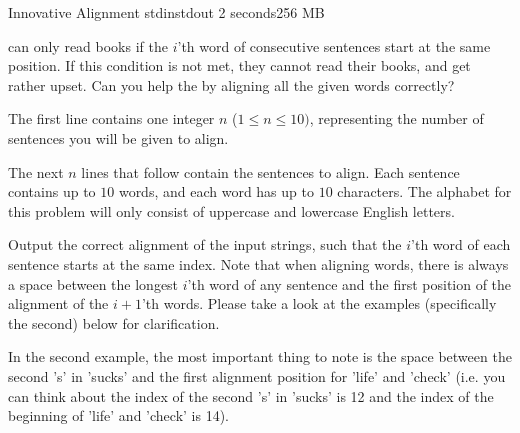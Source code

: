 \begin{problem}{Innovative Alignment}
{stdin}{stdout}
{2 seconds}{256 MB}{}

\Stringers can only read books if the $i$'th word of consecutive sentences start at the same position. If this condition is not met, they cannot read their books, and get rather upset. Can you help the \Stringers by aligning all the given words correctly?

\InputFile

The first line contains one integer $n$ ($1 \leq n \leq 10)$, representing the number of sentences you will be given to align.

The next $n$ lines that follow contain the sentences to align. Each sentence contains up to $10$ words, and each word has up to $10$ characters. The alphabet for this problem will only consist of uppercase and lowercase English letters.
\OutputFile

Output the correct alignment of the input strings, such that the $i$'th word of each sentence starts at the same index. Note that when aligning words, there is always a space between the longest $i$'th word of any sentence and the first position of the alignment of the $i+1$'th words. Please take a look at the examples (specifically the second) below for clarification.

\Examples

\begin{example}
%
\end{example}

\begin{example}
%
\end{example}
\Explanation
In the second example, the most important thing to note is the space between the second 's' in 'sucks' and the first alignment position for 'life' and 'check' (i.e. you can think about the index of the second 's' in 'sucks' is 12 and the index of the beginning of 'life' and 'check' is 14).


\end{problem}
